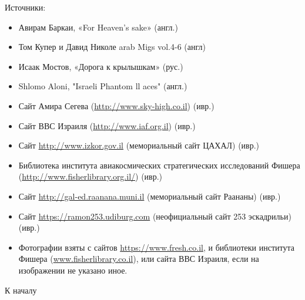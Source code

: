 Источники:
\begin{itemize}
	\item Авирам Баркаи, «For Heaven's sake» (англ.)

	\item Том Купер и Давид Николе arab Migs vol.4-6 (англ)   

\item Исаак Мостов, «Дорога к крылышкам» (рус.)

\item Shlomo Aloni, "Israeli Phantom ll aces" (англ.)

\item Сайт Амира Сегева (\url{http://www.sky-high.co.il}) (ивр.)

\item Сайт ВВС Израиля (\url{http://www.iaf.org.il}) (ивр.)

\item Сайт \url{http://www.izkor.gov.il} (мемориальный сайт ЦАХАЛ) (ивр.)

\item Библиотека института авиакосмических стратегических исследований Фишера (\url{http://www.fisherlibrary.org.il/}) (ивр.)

\item Сайт \url{http://gal-ed.raanana.muni.il} (мемориальный сайт Раананы) (ивр.)

\item Сайт \url{https://ramon253.udiburg.com} (неофициальный сайт 253 эскадрильи) (ивр.)

\item Фотографии взяты с сайтов \url{https://www.fresh.co.il}, и библиотеки института Фишера (\url{www.fisherlibrary.co.il}), или сайта ВВС Израиля, если на изображении не указано иное.
\end{itemize}


К началу \pageref{tablecont}

